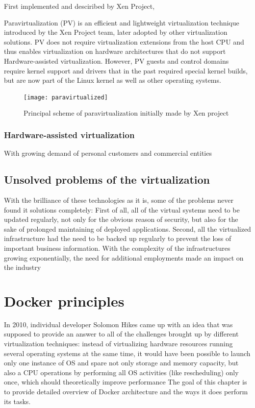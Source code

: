 First implemented and desciribed by Xen Project,

\begin{definition}
Paravirtualization (PV) is an efficient and lightweight virtualization technique
introduced by the Xen Project team, later adopted by other
virtualization solutions. PV does not require virtualization extensions from
the host CPU and thus enables virtualization on hardware architectures that do
not support Hardware-assisted virtualization.
However, PV guests and control domains require kernel
support and drivers that in the past required special kernel builds,
but are now part of the Linux kernel as well as other operating systems.\cite{ParavirtualizationDefinition}
\end{definition}

\begin{figure}
\texttt{[image: paravirtualized]}
\caption{Principal scheme of paravirtualization initially made by Xen project}
\end{figure}

\subsubsection{Hardware-assisted virtualization}

With growing demand of personal customers and commercial entities

\subsection{Unsolved problems of the virtualization}


With the brilliance of these technologies as it is,
some of the problems never found it solutions completely:
First of all, all of the virtual systems
need to be updated regularly, not only for the obvious reason of security,
but also for the sake of prolonged maintaining of deployed applications.
Second, all the virtualized infrastructure had the
need to be backed up regularly to
prevent the loss of important business information.
With the complexity of the infrastructures
growing exponentially, the need for additional
employments made an impact on the industry

\section{Docker principles}

In 2010, individual developer Solomon Hikes came up with an idea that was
supposed to provide an answer to all of the challenges brought up by different
virtualization techniques: instead of virtualizing hardware resources running
several operating systems at the same time, it would have been possible
to launch only one instance of OS and spare not only storage and memory capacity,
but also a CPU operations by performing all
OS activities (like rescheduling) only once, which should theoretically
improve performance
The goal of this chapter is to provide detailed overview of Docker architecture
and the ways it does perform its tasks.

